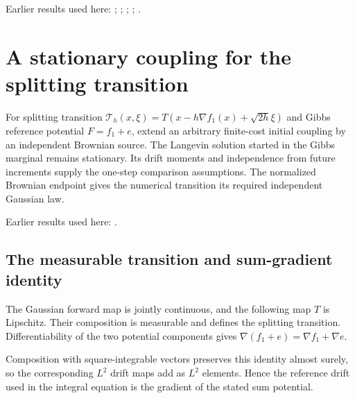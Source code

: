 \documentclass[11pt,a4paper]{report}
\begin{document}
Earlier results used here: \cite[Section~3.17.1]{LangevinLean2026ULASC}; \cite[Section~3.17.2]{LangevinLean2026ULASC}; \cite[Section~3.17.3]{LangevinLean2026ULASC}; \cite[Section~3.17.4]{LangevinLean2026ULASC}; \cite[Section~3.18.2]{LangevinLean2026ULASC}.
\section{\texorpdfstring{A stationary coupling for the splitting transition}{A stationary coupling for the splitting transition}}
\label{proof-module-ProximalLangevin-SplittingCanonical-lean}


For splitting transition \(\mathcal T_h(x,\xi)=T(x-h\nabla f_1(x)+\sqrt{2h}\xi)\) and Gibbs reference potential \(F=f_1+e\), extend an arbitrary finite-cost initial coupling by an independent Brownian source. The Langevin solution started in the Gibbs marginal remains stationary. Its drift moments and independence from future increments supply the one-step comparison assumptions. The normalized Brownian endpoint gives the numerical transition its required independent Gaussian law.



Earlier results used here: \cite[Section~3.45]{LangevinLean2026ULASC}.
\subsection{\texorpdfstring{The measurable transition and sum-gradient identity}{The measurable transition and sum-gradient identity}}
\label{report-step-ProximalLangevin-SplittingCanonical-lean-1}


The Gaussian forward map is jointly continuous, and the following map \(T\) is Lipschitz. Their composition is measurable and defines the splitting transition. Differentiability of the two potential components gives \(\nabla(f_1+e)=\nabla f_1+\nabla e\).



Composition with square-integrable vectors preserves this identity almost surely, so the corresponding \(L^2\) drift maps add as \(L^2\) elements. Hence the reference drift used in the integral equation is the gradient of the stated sum potential.
\end{document}

